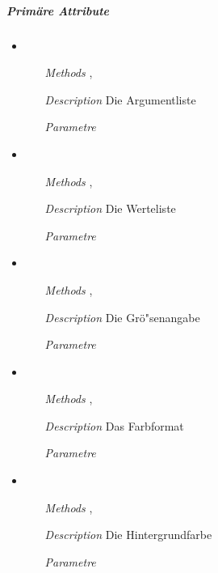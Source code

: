 \subparagraph{Prim\"are Attribute}
\begin{itemize}
  
\item {}
\begin{enumerate}
\item[\textit{Methods}] ,
\item[\textit{Description}] Die Argumentliste
\item[\textit{Parametre}] 
\end{enumerate}

\item {}
\begin{enumerate}
\item[\textit{Methods}] ,
\item[\textit{Description}] Die Werteliste
\item[\textit{Parametre}] 
\end{enumerate}

\item {}
\begin{enumerate}
\item[\textit{Methods}] ,
\item[\textit{Description}] Die Gr\"o"senangabe
\item[\textit{Parametre}] 
\end{enumerate}

\item {}
\begin{enumerate}
\item[\textit{Methods}] , 
\item[\textit{Description}] Das Farbformat
\item[\textit{Parametre}] 
\end{enumerate}

\item {}
\begin{enumerate}
\item[\textit{Methods}] , 
\item[\textit{Description}] Die Hintergrundfarbe
\item[\textit{Parametre}] 
\end{enumerate}


\end{itemize}
